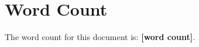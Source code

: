 \documentclass[12pt]{article}
\begin{document}

  \section*{Word Count}
  \label{sec:word-count}

  The word count for this document is: \textbf{[word count]}.

  \printbibliography
  
\end{document}
